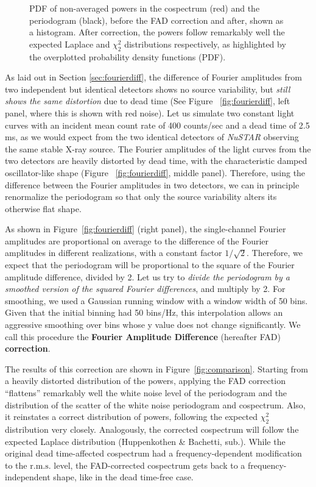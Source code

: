 \documentclass[twocolumn]{aastex61}
\newcommand{\project}[1]{\textsl{#1}}
\newcommand{\nustar}{\project{NuSTAR}\xspace}
\newcommand{\rms}{\ensuremath{\mathrm{r.m.s.}}\xspace}
\begin{document}
\begin{figure*}
\caption{PDF of non-averaged powers in the cospectrum (red) and the periodogram (black), before the FAD correction and after, shown as a histogram. 
After correction, the powers follow remarkably well the expected Laplace and $\chi^2_2$ distributions respectively, as highlighted by the overplotted probability density functions (PDF).}
\label{fig:dist}
\end{figure*}

As laid out in Section \ref{sec:fourierdiff}, the difference of Fourier amplitudes from two independent but identical detectors shows no source variability, but \textit{still shows the same distortion} due to dead time (See Figure ~\ref{fig:fourierdiff}, left panel, where this is shown with red noise).
Let us simulate two constant light curves with an incident mean count rate of 400 counts/sec and a dead time of 2.5 ms, as we would expect from the two identical detectors of \nustar observing the same stable X-ray source.
The Fourier amplitudes of the light curves from the two detectors are heavily distorted by dead time, with the characteristic damped oscillator-like shape \citep{Vikhlinin+94,Zhang+95}  (Figure ~\ref{fig:fourierdiff}, middle panel). 
Therefore, using the difference between the Fourier amplitudes in two detectors, we can in principle renormalize the periodogram so that only the source variability alters its otherwise flat shape.

As shown in Figure~\ref{fig:fourierdiff} (right panel), the single-channel Fourier amplitudes are proportional on average to the difference of the Fourier amplitudes in different realizations, with a constant factor $1/\sqrt{2}$.
Therefore, we expect that the periodogram will be proportional to the square of the Fourier amplitude difference, divided by 2.
Let us try to \textit{divide the periodogram by a smoothed version of the squared Fourier differences}, and multiply by 2.
For smoothing, we used a Gaussian running window with a window width of 50 bins.
Given that the initial binning had 50 bins/Hz, this interpolation allows an aggressive smoothing over bins whose y value does not change significantly.
We call this procedure the \textbf{Fourier Amplitude Difference} (hereafter FAD) \textbf{correction}.

The results of this correction are shown in Figure~\ref{fig:comparison}. 
Starting from a heavily distorted distribution of the powers, applying the FAD correction ``flattens'' remarkably well the white noise level of the periodogram and the distribution of the scatter of the white noise periodogram and cospectrum. 
Also, it reinstates a correct distribution of powers, following the expected $\chi^2_2$ distribution \citep{Lewin+88} very closely. 
Analogously, the corrected cospectrum will follow the expected Laplace distribution (Huppenkothen \& Bachetti, sub.).
While the original dead time-affected cospectrum had a frequency-dependent modification to the \rms level, the FAD-corrected cospectrum gets back to a frequency-independent shape, like in the dead time-free case.
\end{document}
